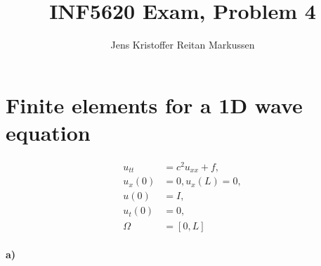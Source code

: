 \documentclass[11pt,a4paper]{article}
\author{Jens Kristoffer Reitan Markussen}
\title{INF5620 Exam, Problem 4}
\begin{document}
\maketitle
\section*{Finite elements for a 1D wave equation}
\begin{align}
u_{tt} &= c^2u_{xx} + f,\\
u_{x}(0) &= 0, u_{x}(L) = 0,\\
u(0) &= I,\\
u_{t}(0) &= 0, \\ 
\Omega &= [0,L]
\end{align}
\paragraph*{a)}
\end{document}
